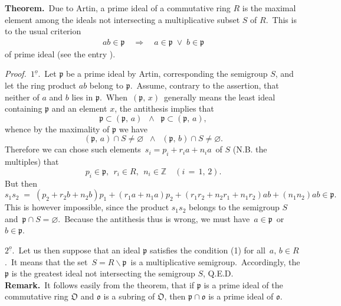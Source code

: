 \documentclass[12pt]{article}
\theoremstyle{definition}
\begin{document}
\textbf{Theorem.}\, Due to Artin, a prime ideal of a commutative ring $R$ is the maximal element among the ideals not intersecting a multiplicative subset $S$ of $R$.\, This is  to the usual criterion 
\begin{align}
ab \in \mathfrak{p} \quad \Rightarrow \quad a \in \mathfrak{p} \;\lor\; b \in \mathfrak{p}
\end{align}
of prime ideal (see the entry ).


{\em Proof.}\, $1^{\underline{o}}$.\, Let $\mathfrak{p}$ be a prime ideal by Artin, corresponding the semigroup $S$, and let the ring product $ab$ belong to $\mathfrak{p}$.\, Assume, contrary to the assertion, that\, neither of $a$ and $b$ lies in $\mathfrak{p}$.\, When\, $(\mathfrak{p},\,x)$\, generally means the least ideal containing $\mathfrak{p}$ and an element $x$, the antithesis implies that
$$\mathfrak{p} \subset (\mathfrak{p},\,a) \;\; \land \;\; \mathfrak{p} \subset (\mathfrak{p},\,a),$$
whence by the maximality of $\mathfrak{p}$ we have
$$(\mathfrak{p},\,a)\cap S \neq \varnothing \;\; \land \;\; (\mathfrak{p},\,b)\cap S \neq \varnothing.$$
Therefore we can chose such elements \,$s_i = p_i+r_ia+n_ia$\, of $S$ (N.B. the multiples) that
$$p_i \in \mathfrak{p},\;\, r_i \in R,\;\, n_i \in \mathbb{Z} \quad (i \,=\, 1,\,2).$$
But then
$$s_1s_2 \;=\; (p_2+r_2b+n_2b)p_1+(r_1a+n_1a)p_2+(r_1r_2+n_2r_1+n_1r_2)ab+(n_1n_2)ab \in \mathfrak{p}.$$
This is however impossible, since the product $s_1s_2$ belongs to the semigroup $S$ and\, 
$\mathfrak{p}\cap S = \varnothing$.\, Because the antithesis thus is wrong, we must have\, $a \in \mathfrak{p}$\, or\, $b \in \mathfrak{p}$.

$2^{\underline{o}}$.\, Let us then suppose that an ideal $\mathfrak{p}$ satisfies the condition (1) for all\, 
$a,\,b \in R$.\, It means that the set\, $S = R\!\smallsetminus\!\mathfrak{p}$\, is a multiplicative semigroup.\, Accordingly, the $\mathfrak{p}$ is the greatest ideal not intersecting the semigroup $S$, Q.E.D.\\

\textbf{Remark.}\, It follows easily from the theorem, that if $\mathfrak{p}$ is a prime ideal of the commutative ring 
$\mathfrak{O}$ and $\mathfrak{o}$ is a subring of $\mathfrak{O}$, then $\mathfrak{p\cap o}$ is a prime ideal of 
$\mathfrak{o}$.


\end{document}
